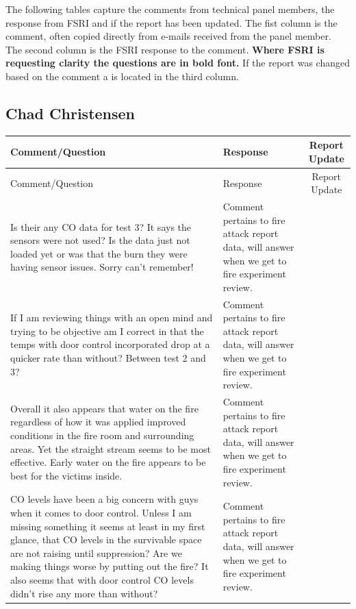 \documentclass[12pt,oneside]{book}
\begin{document}
The following tables capture the comments from technical panel members, the response from FSRI and if the report has been updated. The fist column is the comment, often copied directly from e-mails received from the panel member. The second column is the FSRI response to the comment. \textbf{Where FSRI is requesting clarity the questions are in bold font.} If the report was changed based on the comment a \checkmark is located in the third column. 
\begin{landscape}

\pagestyle{empty}
\section{Chad Christensen}
\begin{longtable}{|L{4in}|L{3.75in}|c|}

		\hline
		Comment/Question & Response & Report Update \\ 
		\toprule[1.0pt] \endfirsthead
		\hline
		Comment/Question & Response & Report Update \\ 
		\toprule[1.0pt] \endhead
		\hline
		Is their any CO data for test 3? It says the sensors were not used? Is the data just not loaded yet or was that the burn they were having sensor issues. Sorry can't remember! &
		Comment pertains to fire attack report data, will answer when we get to fire experiment review. & \\
		
		\hline
		If I am reviewing things with an open mind and trying to be objective am I correct in that the temps with door control incorporated drop at a quicker rate than without? Between test 2 and 3? & 
		Comment pertains to fire attack report data, will answer when we get to fire experiment review. & \\

		\hline
		Overall it also appears that water on the fire regardless of how it was applied improved conditions in the fire room and surrounding areas. Yet the straight stream seems to be most effective. Early water on the fire appears to be best for the victims inside. &
		Comment pertains to fire attack report data, will answer when we get to fire experiment review. & \\

		\hline
		CO levels have been a big concern with guys when it comes to door control. Unless I am missing something it seems at least in my first glance, that CO levels in the survivable space are not raising until suppression? Are we making things worse by putting out the fire? It also seems that with door control CO levels didn't rise any more than without? & 
		Comment pertains to fire attack report data, will answer when we get to fire experiment review. & \\


\end{longtable}
\end{landscape}
\end{document}
